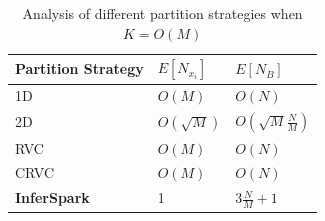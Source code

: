 \begin{table}[h]
	\centering
	\caption{Analysis of different partition strategies when $K = O(M)$}
	\label{tab:max_v_per_edge_part_OM}
	\small
	\begin{tabular}{lll}
		\hline
		Partition Strategy & $E[N_{x_i}]$ & $E[N_B]$\\\hline\hline
		1D & $O(M)$ & $O(N)$ \\\hline
		2D & $O(\sqrt{M})$ & $O(\sqrt{M}\frac{N}{M})$ \\\hline
		RVC & $O(M)$ & $O(N)$ \\\hline
		CRVC & $O(M)$ & $O(N)$ \\\hline
		{\bf InferSpark} & 1 & $3\frac{N}{M}+1$ \\\hline
	\end{tabular}
\end{table}

